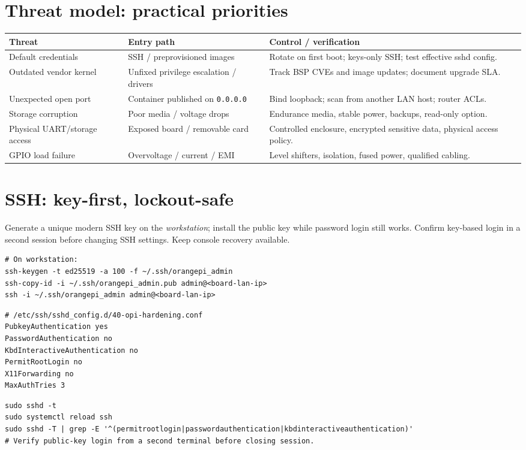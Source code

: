 \documentclass[10pt,oneside,openany]{report}
\newcommand{\code}[1]{\texttt{#1}}
\begin{document}
\section{Threat model: practical priorities}
\begin{center}\small\begin{tabularx}{\textwidth}{@{}>{\raggedright\arraybackslash}p{2.7cm}>{\raggedright\arraybackslash}X >{\raggedright\arraybackslash}X@{}}\toprule
\textbf{Threat} & \textbf{Entry path} & \textbf{Control / verification}\\\midrule
Default credentials & SSH / preprovisioned images & Rotate on first boot; keys-only SSH; test effective sshd config.\\
Outdated vendor kernel & Unfixed privilege escalation / drivers & Track BSP CVEs and image updates; document upgrade SLA.\\
Unexpected open port & Container published on \code{0.0.0.0} & Bind loopback; scan from another LAN host; router ACLs.\\
Storage corruption & Poor media / voltage drops & Endurance media, stable power, backups, read-only option.\\
Physical UART/storage access & Exposed board / removable card & Controlled enclosure, encrypted sensitive data, physical access policy.\\
GPIO load failure & Overvoltage / current / EMI & Level shifters, isolation, fused power, qualified cabling.\\\bottomrule\end{tabularx}\end{center}
\section{SSH: key-first, lockout-safe}
Generate a unique modern SSH key on the \emph{workstation}; install the public key while password login still works. Confirm key-based login in a second session before changing SSH settings. Keep console recovery available.
\begin{lstlisting}[style=sh]
# On workstation:
ssh-keygen -t ed25519 -a 100 -f ~/.ssh/orangepi_admin
ssh-copy-id -i ~/.ssh/orangepi_admin.pub admin@<board-lan-ip>
ssh -i ~/.ssh/orangepi_admin admin@<board-lan-ip>
\end{lstlisting}
\begin{lstlisting}[style=config]
# /etc/ssh/sshd_config.d/40-opi-hardening.conf
PubkeyAuthentication yes
PasswordAuthentication no
KbdInteractiveAuthentication no
PermitRootLogin no
X11Forwarding no
MaxAuthTries 3
\end{lstlisting}
\begin{lstlisting}[style=sh]
sudo sshd -t
sudo systemctl reload ssh
sudo sshd -T | grep -E '^(permitrootlogin|passwordauthentication|kbdinteractiveauthentication)'
# Verify public-key login from a second terminal before closing session.
\end{lstlisting}
\end{document}

